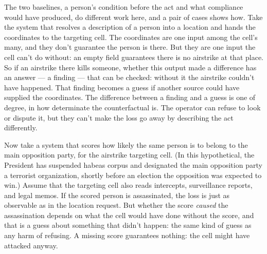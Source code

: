 The two baselines, a person's condition before the act and what compliance would have produced, do different work here, and a pair of cases shows how. Take the system that resolves a description of a person into a location and hands the coordinates to the targeting cell. The coordinates are one input among the cell's many, and they don't guarantee the person is there. But they are one input the cell can't do without: an empty field guarantees there is no airstrike at that place. So if an airstrike there kills someone, whether this output made a difference has an answer — a finding — that can be checked: without it the airstrike couldn't have happened. That finding becomes a guess if another source could have supplied the coordinates. The difference between a finding and a guess is one of degree, in how determinate the counterfactual is. The operator can refuse to look or dispute it, but they can't make the loss go away by describing the act differently.

Now take a system that scores how likely the same person is to belong to the main opposition party, for the airstrike targeting cell. (In this hypothetical, the President has suspended habeas corpus and designated the main opposition party a terrorist organization, shortly before an election the opposition was expected to win.) Assume that the targeting cell also reads intercepts, surveillance reports, and legal memos. If the scored person is assassinated, the loss is just as observable as in the location request. But whether the score \emph{caused} the assassination depends on what the cell would have done without the score, and that is a guess about something that didn't happen: the same kind of guess as any harm of refusing. A missing score guarantees nothing: the cell might have attacked anyway.

